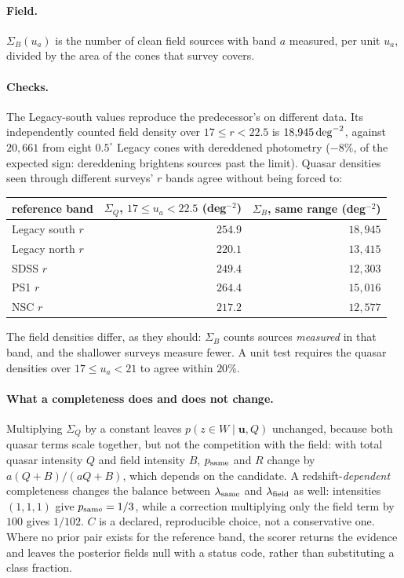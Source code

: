 \documentclass[11pt,a4paper]{article}
\newcommand{\uvec}{\mathbf{u}}
\newcommand{\Sq}{\Sigma_{Q}}
\newcommand{\Sb}{\Sigma_{B}}
\begin{document}
\paragraph{Field.} $\Sb(u_a)$ is the number of clean field sources with band $a$
measured, per unit $u_a$, divided by the area of the cones that survey covers.

\paragraph{Checks.} The Legacy-south values reproduce the predecessor's on
different data. Its independently counted field density over $17\le r<22.5$ is
$18{,}945\,{\rm deg}^{-2}$, against $20{,}661$ from eight $0.5^\circ$ Legacy cones
with dereddened photometry ($-8\%$, of the expected sign: dereddening brightens
sources past the limit). Quasar densities seen through different surveys' $r$
bands agree without being forced to:

\begin{center}
\begin{tabular}{lrr}
\toprule
reference band & $\Sq$, $17\le u_a<22.5$ (deg$^{-2}$) & $\Sb$, same range (deg$^{-2}$) \\
\midrule
Legacy south $r$ & $254.9$ & $18{,}945$ \\
Legacy north $r$ & $220.1$ & $13{,}415$ \\
SDSS $r$         & $249.4$ & $12{,}303$ \\
PS1 $r$          & $264.4$ & $15{,}016$ \\
NSC $r$          & $217.2$ & $12{,}577$ \\
\bottomrule
\end{tabular}
\end{center}

\noindent
The field densities differ, as they should: $\Sb$ counts sources \emph{measured}
in that band, and the shallower surveys measure fewer. A unit test requires the
quasar densities over $17\le u_a<21$ to agree within $20\%$.

\paragraph{What a completeness does and does not change.} Multiplying $\Sq$ by a
constant leaves $p(z\in W\mid\uvec,Q)$ unchanged, because both quasar terms scale
together, but not the competition with the field: with total quasar intensity
$Q$ and field intensity $B$, $p_{\rm same}$ and $R$ change by $a(Q+B)/(aQ+B)$,
which depends on the candidate. A redshift-\emph{dependent} completeness changes
the balance between $\lambda_{\rm same}$ and $\lambda_{\rm field}$ as well:
intensities $(1,1,1)$ give $p_{\rm same}=1/3$, while a correction multiplying
only the field term by $100$ gives $1/102$. $C$ is a declared, reproducible
choice, not a conservative one. Where no prior pair exists for the reference
band, the scorer returns the evidence and leaves the posterior fields null with
a status code, rather than substituting a class fraction.
\end{document}
